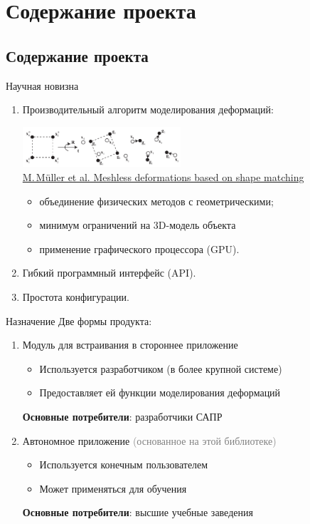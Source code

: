 \documentclass[usenames,dvipsnames,pdftex,unicode,hidelinks]{beamer}
\let\softalert\textbf  %
\begin{document}
  \section{Содержание проекта}
  \subsection{Содержание проекта}
  \begin{frame}{Научная новизна}
    \begin{enumerate}
      \setlength{\itemsep}{4mm}
      \item Производительный алгоритм моделирования деформаций:

        \includegraphics[height=15mm]{meshless}\\[-2mm]
        {
          \tiny \textcopyright{} \href{http://dx.doi.org/10.1145/1186822.1073216}{M.\,M\"{u}ller et al. Meshless deformations based on shape matching}
        }
        \begin{itemize}
          \item объединение физических методов с \alert{геометрическими};
          \item \alert{минимум ограничений} на 3D-модель объекта
          \item применение графического процессора (\alert{GPU}).
        \end{itemize}
      \item \alert{Гибкий} программный интерфейс (API).
      \item Простота \alert{конфигурации}.
    \end{enumerate}
  \end{frame}

  \begin{frame}{Назначение}
    Две формы продукта:

    \begin{enumerate}
      \setlength{\itemsep}{5mm}
      \item Модуль для встраивания в стороннее приложение
        \begin{itemize}
          \item Используется разработчиком (в более крупной системе)
          \item Предоставляет ей функции моделирования деформаций
        \end{itemize}
        \softalert{Основные потребители}: разработчики САПР
      \item Автономное приложение \textcolor{Gray}{(основанное на этой библиотеке)}
        \begin{itemize}
          \item Используется конечным пользователем
          \item Может применяться для обучения
        \end{itemize}
        \softalert{Основные потребители}: высшие учебные заведения
    \end{enumerate}
  \end{frame}
\end{document}
